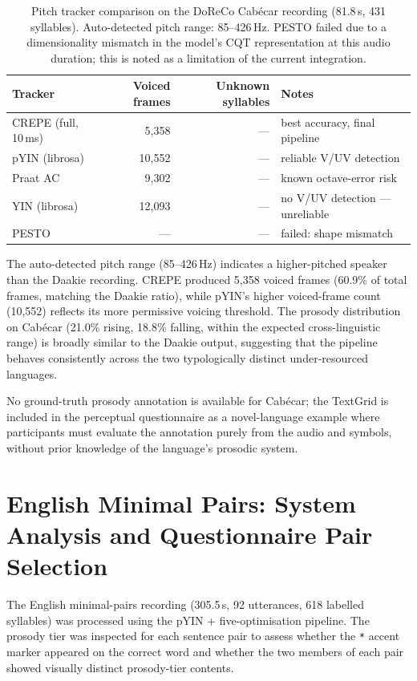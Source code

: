 \begin{table}[h]
\centering
\caption{Pitch tracker comparison on the DoReCo Cabécar recording (81.8\,s,
431 syllables). Auto-detected pitch range: 85--426\,Hz.
PESTO failed due to a dimensionality mismatch in the model's CQT representation
at this audio duration; this is noted as a limitation of the current integration.}
\label{tab:cabeca_trackers}
\small
\begin{tabular}{lrrl}
\hline
Tracker & Voiced frames & Unknown syllables & Notes \\
\hline
CREPE (full, 10\,ms)  & 5{,}358  & ---   & best accuracy, final pipeline \\
pYIN (librosa)        & 10{,}552 & ---   & reliable V/UV detection \\
Praat AC              & 9{,}302  & ---   & known octave-error risk \\
YIN (librosa)         & 12{,}093 & ---   & no V/UV detection --- unreliable \\
PESTO                 & ---      & ---   & failed: shape mismatch \\
\hline
\end{tabular}
\end{table}

The auto-detected pitch range (85--426\,Hz) indicates a higher-pitched speaker
than the Daakie recording. CREPE produced 5{,}358 voiced frames (60.9\% of
total frames, matching the Daakie ratio), while pYIN's higher voiced-frame count
(10{,}552) reflects its more permissive voicing threshold. The prosody
distribution on Cabécar (21.0\% rising, 18.8\% falling, within the expected
cross-linguistic range) is broadly similar to the Daakie output, suggesting
that the pipeline behaves consistently across the two typologically distinct
under-resourced languages.

No ground-truth prosody annotation is available for Cabécar; the TextGrid is
included in the perceptual questionnaire as a novel-language example where
participants must evaluate the annotation purely from the audio and symbols,
without prior knowledge of the language's prosodic system.

\section{English Minimal Pairs: System Analysis and Questionnaire Pair Selection}
\label{sec:english_analysis}

The English minimal-pairs recording (305.5\,s, 92 utterances, 618 labelled
syllables) was processed using the pYIN + five-optimisation pipeline. The
prosody tier was inspected for each sentence pair to assess whether the
\texttt{*} accent marker appeared on the correct word and whether the two
members of each pair showed visually distinct prosody-tier contents.

